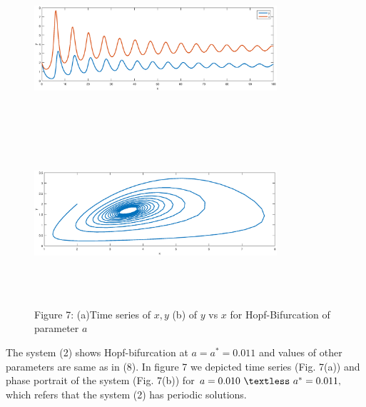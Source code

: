 \documentclass[a4paper, 10pt]{article}
\begin{document}
\begin{figure}[H]
	{\includegraphics[width=9cm, height=6cm]{14a.eps}}
	\endminipage\hfill
	{\includegraphics[width=9cm, height=6cm]{14b.eps}}
	\endminipage\hfill
	\begin{center} Figure 7: (a)Time series of $x,y$  (b)  of $y$ vs $x$ for Hopf-Bifurcation of parameter $a$  \end{center}
\end{figure}
The system (2) shows Hopf-bifurcation at $a=a^*=0.011$ and values of other parameters are same as in (8). In figure 7 we depicted time series (Fig. 7(a)) and phase portrait of the system (Fig. 7(b)) for $a=0.010~\textless~a^*=0.011,$ which refers that the system (2) has periodic solutions. 
 
\end{document}
